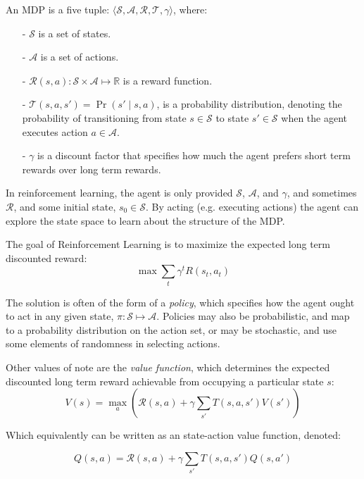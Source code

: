 \documentclass[11pt]{article}
\begin{document}
An MDP is a five tuple: $\langle \mathcal{S}, \mathcal{A}, \mathcal{R}, \mathcal{T}, \gamma \rangle$, where:
\begin{itemize}
\item[-] $\mathcal{S}$ is a set of states.
\item[-] $\mathcal{A}$ is a set of actions.
\item[-] $\mathcal{R}(s,a) : \mathcal{S} \times \mathcal{A} \mapsto \mathbb{R}$ is a reward function.
\item[-] $\mathcal{T}(s,a,s') = \Pr(s' \mid s, a)$, is a probability distribution, denoting the probability of transitioning from state $s \in \mathcal{S}$ to state $s' \in \mathcal{S}$ when the agent executes action $a \in \mathcal{A}$.
\item[-] $\gamma$ is a discount factor that specifies how much the agent prefers short term rewards over long term rewards.
\end{itemize}

In reinforcement learning, the agent is only provided $\mathcal{S}$, $\mathcal{A}$, and $\gamma$, and sometimes $\mathcal{R}$, and some initial state, $s_0 \in \mathcal{S}$. By acting (e.g. executing actions) the agent can explore the state space to learn about the structure of the MDP.

The goal of Reinforcement Learning is to maximize the expected long term discounted reward:
\begin{equation}
\max \sum_t \gamma^t R(s_t,a_t)
\end{equation}

The solution is often of the form of a {\it policy}, which specifies how the agent ought to act in any given state, $\pi : \mathcal{S} \mapsto \mathcal{A}$. Policies may also be probabilistic, and map to a probability distribution on the action set, or may be stochastic, and use some elements of randomness in selecting actions.

Other values of note are the {\it value function}, which determines the expected discounted long term reward achievable from occupying a particular state $s$:
\begin{equation}
V(s) = \max_a \left(\mathcal{R}(s,a) + \gamma \sum_{s'} T(s,a,s') V(s')\right)
\end{equation}

Which equivalently can be written as an state-action value function, denoted:

\begin{equation}
Q(s,a) = \mathcal{R}(s,a) + \gamma \sum_{s'} T(s,a,s') Q(s,a')
\end{equation}
\end{document}

